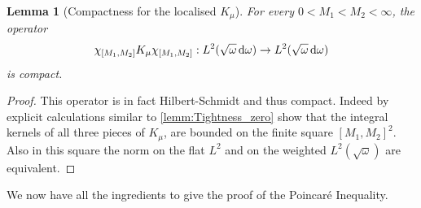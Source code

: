 \documentclass[reqno,11pt,letterpaper]{amsart}
\numberwithin{equation}{section}
\newcommand{\dd}{\, {\rm d}}
\newtheorem{lemma}[proposition]{Lemma}
\begin{document}
\begin{lemma}[Compactness for the localised $K_\mu$]
\label{lem:local_K_mu_compact}
For every $0<M_1<M_2<\infty$, the operator
$$\chi_{[M_1,M_2]}K_\mu\chi_{[M_1,M_2]}:L^2(\sqrt{\omega}\dd\omega)\to L^2(\sqrt{\omega}\dd\omega)
$$
is compact.
\end{lemma}
\begin{proof}
This operator is in fact Hilbert-Schmidt and thus compact. Indeed by explicit calculations similar to \ref{lemm:Tightness_zero} show that the integral kernels of all three pieces of $K_\mu$, are bounded on the finite square $[M_1,M_2]^2$. Also in this square the norm on the flat $L^2$ and on the weighted $L^2(\sqrt{\omega})$ are equivalent. 
\end{proof}

We now have all the ingredients to give the proof of the Poincaré Inequality. 
\end{document}
